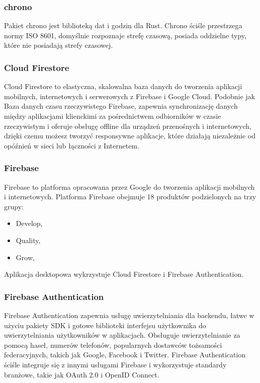\documentclass[12pt,a4paper]{article}
\begin{document}
				\subsubsection{chrono}

					\indent Pakiet chrono jest biblioteką dat i godzin dla Rust. Chrono ściśle przestrzega normy ISO 8601, domyślnie rozpoznaje strefę czasową,
				 	posiada oddzielne typy, które nie posiadają strefy czasowej. 
				\subsubsection{Cloud Firestore}

					\indent	Cloud Firestore to elastyczna, skalowalna baza danych do tworzenia aplikacji mobilnych, internetowych i serwerowych z Firebase i Google Cloud.
					Podobnie jak Baza danych czasu rzeczywistego Firebase, zapewnia synchronizację danych między aplikacjami klienckimi za pośrednictwem odbiorników w czasie
					rzeczywistym i oferuje obsługę offline dla urządzeń przenośnych i internetowych, dzięki czemu możesz tworzyć responsywne aplikacje, które działają niezależnie
					od opóźnień w sieci lub łączności z Internetem.
				\subsubsection{Firebase}

					\indent Firebase to platforma opracowana przez Google do tworzenia aplikacji mobilnych i internetowych. Platforma Firebase obejmuje 18 produktów podzielonych
					na trzy grupy:
					\begin{itemize}
						\item Develop,
						\item Quality,
						\item Grow,
					\end{itemize}
					Aplikacja desktopowa wykrzystuje Cloud Firestore i Firebase Authentication.
				\subsubsection{Firebase Authentication}

					\indent	Firebase Authentication zapewnia usługę uwierzytelniania dla backendu, łatwe w użyciu pakiety SDK i gotowe biblioteki interfejsu użytkownika
					do uwierzytelniania użytkowników w aplikacjach. Obsługuje uwierzytelnianie za pomocą haseł, numerów telefonów, popularnych dostawców tożsamości
					federacyjnych, takich jak Google, Facebook i Twitter. Firebase Authentication ściśle integruje się z innymi usługami Firebase i wykorzystuje standardy
					branżowe, takie jak OAuth 2.0 i OpenID Connect.								
\end{document}
